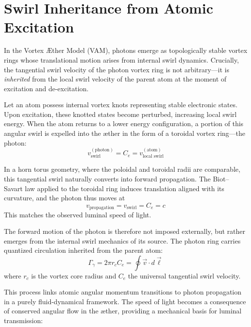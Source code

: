 \section{Swirl Inheritance from Atomic Excitation}\label{sec:swirl-inheritance}

        In the Vortex \AE ther Model (VAM), photons emerge as topologically stable vortex rings whose translational motion arises from internal swirl dynamics. Crucially, the tangential swirl velocity of the photon vortex ring is not arbitrary—it is \emph{inherited} from the local swirl velocity of the parent atom at the moment of excitation and de-excitation.

        Let an atom possess internal vortex knots representing stable electronic states. Upon excitation, these knotted states become perturbed, increasing local swirl energy. When the atom returns to a lower energy configuration, a portion of this angular swirl is expelled into the \ae ther in the form of a toroidal vortex ring—the photon:
        \begin{equation}
            v_{\text{swirl}}^{(\text{photon})} = C_e = v_{\text{local swirl}}^{(\text{atom})}
        \end{equation}

        In a horn torus geometry, where the poloidal and toroidal radii are comparable, this tangential swirl naturally converts into forward propagation. The Biot–Savart law applied to the toroidal ring induces translation aligned with its curvature, and the photon thus moves at
        \begin{equation}
            v_{\text{propagation}} = v_{\text{swirl}} = C_e = c
        \end{equation}
        This matches the observed luminal speed of light.

        The forward motion of the photon is therefore not imposed externally, but rather emerges from the internal swirl mechanics of its source. The photon ring carries quantized circulation inherited from the parent atom:
        \begin{equation}
            \Gamma_\gamma = 2\pi r_c C_e = \oint \vec{v} \cdot d\vec{\ell}
        \end{equation}
        where $r_c$ is the vortex core radius and $C_e$ the universal tangential swirl velocity.

        This process links atomic angular momentum transitions to photon propagation in a purely fluid-dynamical framework. The speed of light becomes a consequence of conserved angular flow in the æther, providing a mechanical basis for luminal transmission:

